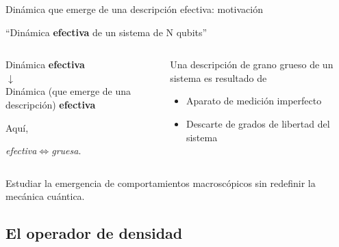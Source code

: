 \begin{frame}{Dinámica que emerge de una descripción efectiva: motivación}
    \begin{center}
        ``Dinámica \textbf{efectiva} de un sistema de N qubits''
    \end{center}
    \pause
    \begin{columns}
        \begin{column}{0.5\textwidth}
            \begin{center}
                Dinámica \textbf{efectiva}\\
                \pause
                $\downarrow$\\
                Dinámica {\tiny(que emerge de una descripción)} \textbf{efectiva}
            \end{center}
            \pause
            Aquí, 
            \begin{center}
                \textit{efectiva}$\iff$\textit{gruesa}.
            \end{center}
        \end{column}
        \pause
        \begin{column}{0.5\textwidth}
            Una descripción de grano grueso de un sistema es resultado de\pause
            \begin{itemize}
                \item Aparato de medición imperfecto
                \item Descarte de grados de libertad del sistema
            \end{itemize}
        \end{column}
    \end{columns}
    \pause
    \begin{center}
        \begin{tcolorbox}
            \begin{center}
                Estudiar la emergencia de comportamientos macroscópicos sin redefinir la mecánica cuántica.
            \end{center}
        \end{tcolorbox}
    \end{center}
\end{frame}


\subsection{El operador de densidad}

